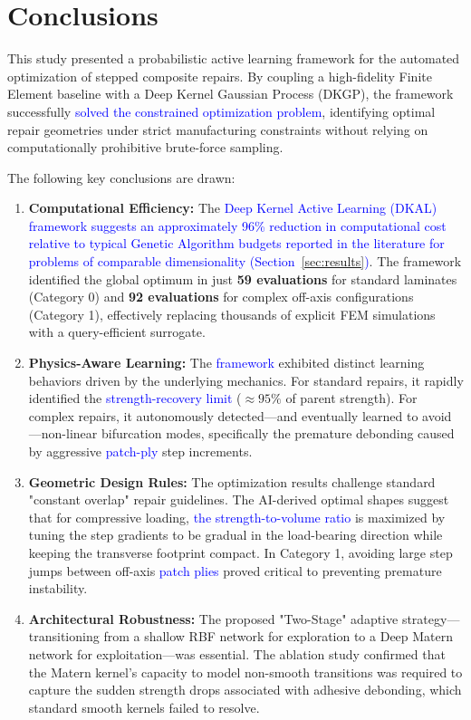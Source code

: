 \documentclass[
  preprint,
  12pt,
  a4paper
]{elsarticle}
\newcommand{\new}[1]{\textcolor{blue}{#1}}
\begin{document}
\section{Conclusions}
\label{sec:conclusion}

This study presented a probabilistic active learning framework for the automated optimization of stepped composite repairs. By coupling a high-fidelity Finite Element baseline with a Deep Kernel Gaussian Process (DKGP), the framework successfully \new{solved the constrained optimization problem}, identifying optimal repair geometries under strict manufacturing constraints without relying on computationally prohibitive brute-force sampling.

The following key conclusions are drawn:
\begin{enumerate}
    \item \textbf{Computational Efficiency:} The \new{Deep Kernel Active Learning (DKAL) framework suggests an approximately 96\% reduction in computational cost relative to typical Genetic Algorithm budgets reported in the literature for problems of comparable dimensionality (Section~\ref{sec:results})}. The framework identified the global optimum in just \textbf{59 evaluations} for standard laminates (Category 0) and \textbf{92 evaluations} for complex off-axis configurations (Category 1), effectively replacing thousands of explicit FEM simulations with a query-efficient surrogate.
    
    \item \textbf{Physics-Aware Learning:} The \new{framework} exhibited distinct learning behaviors driven by the underlying mechanics. For standard repairs, it rapidly identified the \new{strength-recovery limit} ($\approx 95\%$ of parent strength). For complex repairs, it autonomously detected—and eventually learned to avoid—non-linear bifurcation modes, specifically the premature debonding caused by aggressive \new{patch-ply} step increments.
    
    \item \textbf{Geometric Design Rules:} The optimization results challenge standard "constant overlap" repair guidelines. The AI-derived optimal shapes suggest that for compressive loading, \new{the strength-to-volume ratio} is maximized by tuning the step gradients to be gradual in the load-bearing direction while keeping the transverse footprint compact. In Category 1, avoiding large step jumps between off-axis \new{patch plies} proved critical to preventing premature instability.
    
    \item \textbf{Architectural Robustness:} The proposed "Two-Stage" adaptive strategy—transitioning from a shallow RBF network for exploration to a Deep Matern network for exploitation—was essential. The ablation study confirmed that the Matern kernel's capacity to model non-smooth transitions was required to capture the sudden strength drops associated with adhesive debonding, which standard smooth kernels failed to resolve.
\end{enumerate}
\end{document}
